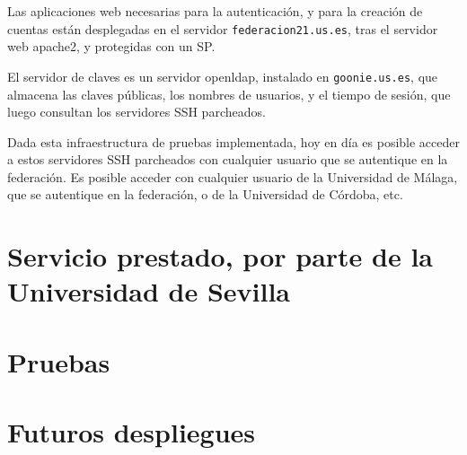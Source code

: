     Las aplicaciones web necesarias para la autenticación, y para la
    creación de cuentas están desplegadas en el servidor
    \texttt{federacion21.us.es}, tras el servidor web apache2, y protegidas
    con un SP.

    El servidor de claves es un servidor openldap, instalado en
    \texttt{goonie.us.es}, que almacena las claves públicas, los nombres de
    usuarios, y el tiempo de sesión, que luego consultan los servidores SSH
    parcheados.

    Dada esta infraestructura de pruebas implementada, hoy en día es
    posible acceder a estos servidores SSH parcheados con cualquier usuario
    que se autentique en la federación. Es posible acceder con cualquier
    usuario de la Universidad de Málaga, que se autentique en la
    federación, o de la Universidad de Córdoba, etc.

    \section{Servicio prestado, por parte de la Universidad de Sevilla}
    \section{Pruebas}
    \section{Futuros despliegues}
